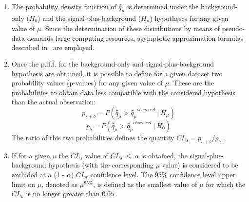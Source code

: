 \begin{enumerate}
%
%
%
	\item The probability density function of $\tilde{q_{\mu}}$ is determined  under the background-only ($H_0$) and 
	the  signal-plus-background ($H_{\mu}$) hypotheses for any given value of $\mu$.
	Since the determination of these distributions by means of pseudo-data demands large computing resources,
	asymptotic approximation formulas described in~\cite{Asympt} are employed.
	

	\item Once the p.d.f. for the background-only and signal-plus-background hypothesis are obtained, 
	it is possible to define for a given dataset  two probability values (p-values) for any given value of $\mu$.
	These are the probabilities to obtain data less compatible with the considered hypothesis than the 
	actual observation:
	$$
	p_{s+b} = P(\tilde{q_{\mu}} > \tilde{q_{\mu}}^{observed} ~ | ~ H_{\mu})  
	$$
	$$ 
	p_{b} = P(\tilde{q_{\mu}} > \tilde{q_{\mu}}^{observed} ~ | ~ H_0)
	$$
	The ratio of this two probabilities defines the quantity $CL_{s} = p_{s+b} / p_{b}$ \cite{cls1,cls2}.

	\item If for a given $\mu$ the $CL_{s}$ value of $CL_{s} ~ \leq ~ \alpha $ is obtained, the signal-plus-background
	 hypothesis (with the corresponding $\mu$ value)  is considered to be 
	 excluded at a (1 - $\alpha$) $CL_{s}$ confidence level. The 95\% confidence level upper limit on $\mu$,
	denoted as $\mu^{95\%}$, is defined as the smallest value of $\mu$ for which the  $CL_{s}$ is no longer 
	greater than  $0.05\,.$
\end{enumerate}
